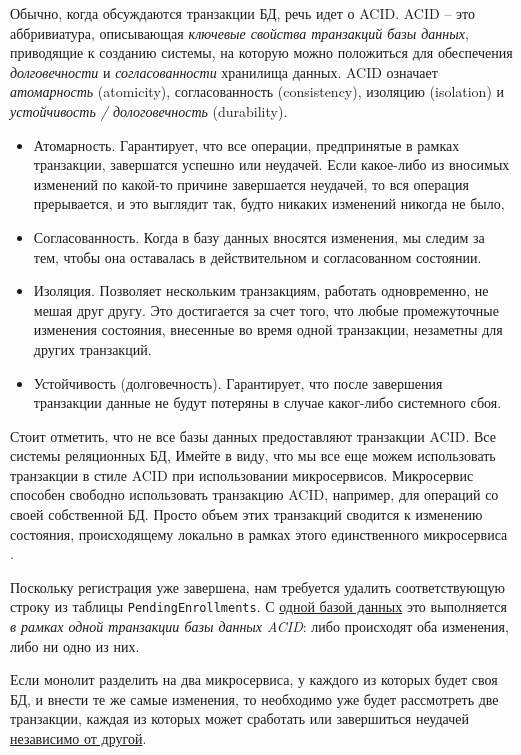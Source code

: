 \documentclass[%
	11pt,
	a4paper,
	utf8,
		]{article}
\begin{document}
Обычно, когда обсуждаются транзакции БД, речь идет о ACID. ACID -- это аббривиатура, описывающая \emph{\color{blue}ключевые свойства транзакций базы данных}, приводящие к созданию системы, на которую можно положиться для обеспечения \emph{долговечности} и \emph{согласованности} хранилища данных. ACID означает \emph{атомарность} (atomicity), согласованность (consistency), изоляцию (isolation) и \emph{устойчивость / дологовечность} (durability).

\begin{itemize}
	\item Атомарность. Гарантирует, что все операции, предпринятые в рамках транзакции, завершатся успешно или неудачей. Если какое-либо из вносимых изменений по какой-то причине завершается неудачей, то вся операция прерывается, и это выглядит так, будто никаких изменений никогда не было,
	
	\item Согласованность. Когда в базу данных вносятся изменения, мы следим за тем, чтобы она оставалась в действительном и согласованном состоянии. 
	
	\item Изоляция. Позволяет нескольким транзакциям, работать одновременно, не мешая друг другу. Это достигается за счет того, что любые промежуточные изменения состояния, внесенные во время одной транзакции, незаметны для других транзакций.
	
	\item Устойчивость (долговечность). Гарантирует, что после завершения транзакции данные не будут потеряны в случае каког-либо системного сбоя.
\end{itemize}

Стоит отметить, что не все базы данных предоставляют транзакции ACID. Все системы реляционных БД, Имейте в виду, что мы все еще можем использовать транзакции в стиле ACID при использовании микросервисов. Микросервис способен свободно использовать транзакцию ACID, например, для операций со своей собственной БД. Просто объем этих транзакций сводится к изменению состояния, происходящему локально в рамках этого единственного микросервиса \cite[]{microservices-2024}.

Поскольку регистрация уже завершена, нам требуется удалить соответствующую строку из таблицы \verb|PendingEnrollments|. С \underline{одной базой данных} это выполняется \emph{в рамках одной транзакции базы данных ACID}: либо происходят оба изменения, либо ни одно из них.

Если монолит разделить на два микросервиса, у каждого из которых будет своя БД, и внести те же самые изменения, то необходимо уже будет рассмотреть две транзакции, каждая из которых может сработать или завершиться неудачей \underline{независимо от другой}.
\end{document}
